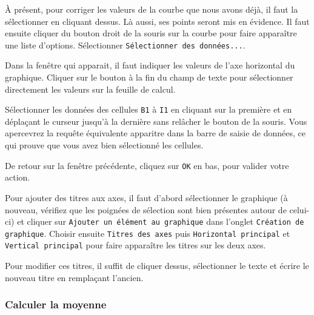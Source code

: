 À présent, pour corriger les valeurs de la courbe que nous avons déjà, il faut la sélectionner en cliquant dessus. Là aussi, ses points seront mis en évidence. Il faut ensuite cliquer du bouton droit de la souris sur la courbe pour faire apparaître une liste d'options. Sélectionner \texttt{Sélectionner des données...}.


Dans la fenêtre qui apparait, il faut indiquer les valeurs de l'axe horizontal du graphique. Cliquer sur le bouton à la fin du champ de texte pour sélectionner directement les valeurs sur la feuille de calcul.


Sélectionner les données des cellules \texttt{B1} à \texttt{I1} en cliquant sur la première et en déplaçant le curseur jusqu'à la dernière sans relâcher le bouton de la souris.  Vous apercevrez la requête équivalente apparitre dans la barre de saisie de données, ce qui prouve que vous avez bien sélectionné les cellules. 


De retour sur la fenêtre précédente, cliquez sur \texttt{OK} en bas, pour valider votre action.


Pour ajouter des titres aux axes, il faut d'abord sélectionner le graphique (à nouveau, vérifiez que les poignées de sélection sont bien présentes autour de celui-ci) et cliquer sur \texttt{Ajouter un élément au graphique} dans l'onglet \texttt{Création de graphique}.  Choisir ensuite \texttt{Titres des axes}  puis \texttt{Horizontal principal} et \texttt{Vertical principal} pour faire apparaître les titres sur les deux axes. 


Pour modifier ces titres, il suffit de cliquer dessus, sélectionner le texte et écrire le nouveau titre en remplaçant l'ancien.

\subsubsection{Calculer la moyenne}

